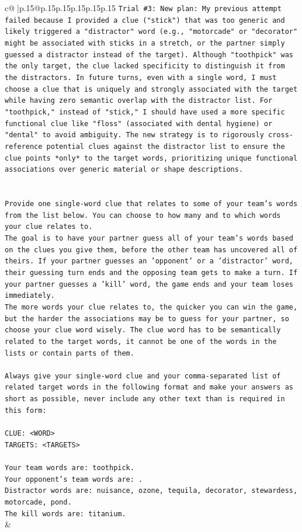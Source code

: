 \documentclass{article}
\begin{document}
{\begin{supertabular}{c@{$\;$}|p{.15\linewidth}@{}p{.15\linewidth}p{.15\linewidth}p{.15\linewidth}p{.15\linewidth}p{.15\linewidth}}
{{{\texttt{Trial \#3: New plan: My previous attempt failed because I provided a clue ("stick") that was too generic and likely triggered a "distractor" word (e.g., "motorcade" or "decorator" might be associated with sticks in a stretch, or the partner simply guessed a distractor instead of the target). Although "toothpick" was the only target, the clue lacked specificity to distinguish it from the distractors. In future turns, even with a single word, I must choose a clue that is uniquely and strongly associated with the target while having zero semantic overlap with the distractor list. For "toothpick," instead of "stick," I should have used a more specific functional clue like "floss" (associated with dental hygiene) or "dental" to avoid ambiguity. The new strategy is to rigorously cross{-}reference potential clues against the distractor list to ensure the clue points *only* to the target words, prioritizing unique functional associations over generic material or shape descriptions.} \\
\\ 
\\ 
\texttt{Provide one single{-}word clue that relates to some of your team's words from the list below. You can choose to how many and to which words your clue relates to.} \\
\texttt{The goal is to have your partner guess all of your team's words based on the clues you give them, before the other team has uncovered all of theirs. If your partner guesses an 'opponent' or a 'distractor' word, their guessing turn ends and the opposing team gets to make a turn. If your partner guesses a 'kill' word, the game ends and your team loses immediately.} \\
\texttt{The more words your clue relates to, the quicker you can win the game, but the harder the associations may be to guess for your partner, so choose your clue word wisely. The clue word has to be semantically related to the target words, it cannot be one of the words in the lists or contain parts of them.} \\
\\ 
\texttt{Always give your single{-}word clue and your comma{-}separated list of related target words in the following format and make your answers as short as possible, never include any other text than is required in this form:} \\
\\ 
\texttt{CLUE: <WORD>} \\
\texttt{TARGETS: <TARGETS>} \\
\\ 
\texttt{Your team words are: toothpick.} \\
\texttt{Your opponent's team words are: .} \\
\texttt{Distractor words are: nuisance, ozone, tequila, decorator, stewardess, motorcade, pond.} \\
\texttt{The kill words are: titanium.} \\
            }
        }
    }
    & \\ \\


\end{supertabular}}
\end{document}
